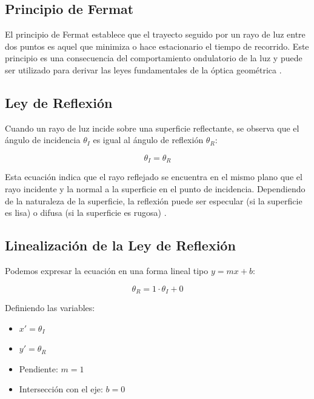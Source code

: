 \documentclass[article,12pt]{elsarticle}
\begin{document}
\subsection*{Principio de Fermat}
El principio de Fermat establece que el trayecto seguido por un rayo de luz entre dos puntos es aquel que minimiza o hace estacionario el tiempo de recorrido. Este principio es una consecuencia del comportamiento ondulatorio de la luz y puede ser utilizado para derivar las leyes fundamentales de la óptica geométrica \cite{Hecht2000, Pedrotti2018}.

\subsection*{Ley de Reflexión}
Cuando un rayo de luz incide sobre una superficie reflectante, se observa que el ángulo de incidencia $\theta_I$ es igual al ángulo de reflexión $\theta_R$:

\begin{mdframed}
\begin{equation}
\theta_I = \theta_R
\end{equation}
\end{mdframed}

Esta ecuación indica que el rayo reflejado se encuentra en el mismo plano que el rayo incidente y la normal a la superficie en el punto de incidencia. Dependiendo de la naturaleza de la superficie, la reflexión puede ser especular (si la superficie es lisa) o difusa (si la superficie es rugosa) \cite{Hecht2000, Tipler1999}.

\subsection*{Linealización de la Ley de Reflexión}
Podemos expresar la ecuación en una forma lineal tipo $y = mx + b$:

\begin{mdframed}
\begin{equation}
\theta_R = 1 \cdot \theta_I + 0
\end{equation}
\end{mdframed}

Definiendo las variables:
\begin{itemize}
\item $x' = \theta_I$
\item $y' = \theta_R$
\item Pendiente: $m = 1$
\item Intersección con el eje: $b = 0$
\end{itemize}
\end{document}
